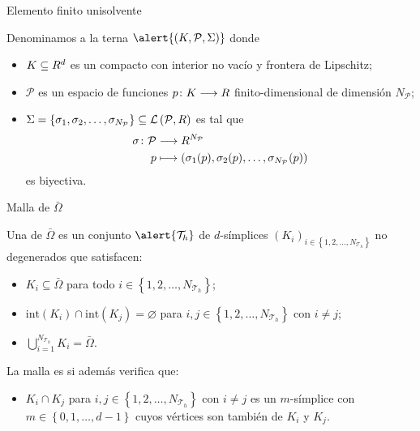 
\begin{frame}{Elemento finito unisolvente}

\begin{definicion}
	Denominamos  a la terna $\alert{\left(K,\mathcal{P},\Sigma\right)}$ donde
	\begin{itemize}
		\item $K\subseteq \relax R^d$ es un compacto con interior no vacío y frontera de Lipschitz;
		\item $\mathcal{P}$ es un espacio de funciones $p\colon K\longrightarrow\relax R$ finito-dimensional de dimensión $N_\mathcal{P}$;
		\item $\Sigma=\left\{\sigma_1,\sigma_2,\ldots,\sigma_{N_\mathcal{P}}\right\}\subseteq\mathcal{L}\left(\mathcal{P},\relax R\right)$ es tal que
		\begin{align*}
		\sigma\colon\mathcal{P}&\longrightarrow \relax R^{N_\mathcal{P}}\\
		p&\longmapsto \left(\sigma_1(p),\sigma_2(p),\ldots,\sigma_{N_\mathcal{P}}(p)\right)
		\end{align*}
		es biyectiva.
	\end{itemize}
\end{definicion}

\end{frame}

\begin{frame}{Malla de $\bar{\Omega}$}

\begin{definicion}
	Una  de $\bar{\Omega}$ es un conjunto $\alert{\mathcal{T}_h}$ de $d$-símplices $\left(K_i\right)_{i\in\left\{1,2,\ldots,N_{\mathcal{T}_h}\right\}}$ no degenerados que satisfacen:
	\begin{itemize}
		\item $K_i\subseteq\bar\Omega$ para todo $i\in\left\{1,2,\ldots,N_{\mathcal{T}_h}\right\}$;
		\item $\text{int}\left(K_i\right)\cap\text{int}\left(K_j\right)=\varnothing$ para $i,j\in\left\{1,2,\ldots,N_{\mathcal{T}_h} \right\}$ con $i\neq j$;
		\item $\displaystyle \bigcup_{i=1}^{N_{\mathcal{T}_h}} K_i=\bar\Omega$.
	\end{itemize}	
	La malla es  si además verifica que:
	\begin{itemize}
		\item $K_i\cap K_j$ para $i,j\in\left\{1,2,\ldots,N_{\mathcal{T}_h} \right\}$ con $i\neq j$ es un $m$-símplice con $m\in\left\{0,1,\ldots,d-1 \right\}$ cuyos vértices son también de $K_i$ y $K_j$.
	\end{itemize}
\end{definicion}

\end{frame}

